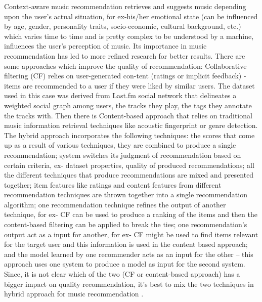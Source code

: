 \documentclass{proc}
\begin{document}
Context-aware music recommendation retrieves and suggests music depending upon the user’s actual situation, for ex-his/her emotional state (can be influenced by age, gender, personality traits, socio-economic, cultural background, etc.) which varies time to time and is pretty complex to be understood by a machine, influences the user’s perception of music. Its importance in music recommendation has led to more refined research for better results. There are some approaches which improve the quality of recommendation: Collaborative filtering (CF) relies on user-generated con-tent (ratings or implicit feedback) - items are recommended to a user if they were liked by similar users. The dataset used in this case was derived from Last.fm social network that delineates a weighted social graph among users, the tracks they play, the tags they annotate the tracks with. Then there is Content-based approach that relies on traditional music information retrieval techniques like acoustic fingerprint or genre detection. 
The hybrid approach incorporates the following techniques: the scores that come up as a result of various techniques, they are combined to produce a single recommendation; system switches its judgment of recommendation based on certain criteria, ex- dataset properties, quality of produced recommendations; all the different techniques that produce recommendations are mixed and presented together; item features like ratings and content features from different recommendation techniques are thrown together into a single recommendation algorithm; one recommendation technique refines the output of another technique, for ex- CF can be used to produce a ranking of the items and then the content-based filtering can be applied to break the ties; one recommendation’s output act as a input for another, for ex- CF might be used to find items relevant for the target user and this information is used in the content based approach; and the model learned by one recommender acts as an input for the other – this approach uses one system to produce a model as input for the second system. Since, it is not clear which of the two (CF or content-based approach) has a bigger impact on quality recommendation, it’s best to mix the two techniques in hybrid approach for music recommendation  \cite{Kaminskas2012}. 
\end{document}
